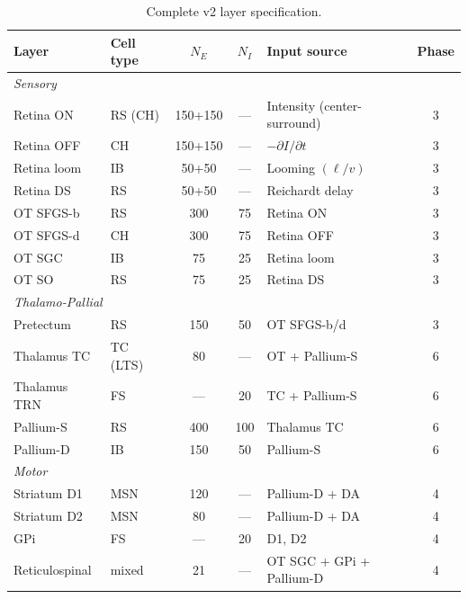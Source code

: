 \documentclass[11pt,a4paper]{article}
\begin{document}
\begin{table}[H]
\centering
\caption{Complete v2 layer specification.}
\label{tab:v2_layers}
\small
\begin{tabular}{llcclc}
\toprule
Layer & Cell type & $N_E$ & $N_I$ & Input source & Phase \\
\midrule
\multicolumn{6}{l}{\textit{Sensory}} \\
Retina ON       & RS (CH)     & 150+150 & --- & Intensity (center-surround)  & 3 \\
Retina OFF      & CH          & 150+150 & --- & $-\partial I/\partial t$      & 3 \\
Retina loom     & IB          &  50+50  & --- & Looming $(\ell/v)$            & 3 \\
Retina DS       & RS          &  50+50  & --- & Reichardt delay               & 3 \\
OT SFGS-b       & RS          & 300     & 75  & Retina ON                     & 3 \\
OT SFGS-d       & CH          & 300     & 75  & Retina OFF                    & 3 \\
OT SGC          & IB          &  75     & 25  & Retina loom                   & 3 \\
OT SO           & RS          &  75     & 25  & Retina DS                     & 3 \\
\midrule
\multicolumn{6}{l}{\textit{Thalamo-Pallial}} \\
Pretectum       & RS          & 150     & 50  & OT SFGS-b/d                  & 3 \\
Thalamus TC     & TC (LTS)    &  80     & --- & OT + Pallium-S               & 6 \\
Thalamus TRN    & FS          & ---     & 20  & TC + Pallium-S               & 6 \\
Pallium-S       & RS          & 400     & 100 & Thalamus TC                  & 6 \\
Pallium-D       & IB          & 150     & 50  & Pallium-S                    & 6 \\
\midrule
\multicolumn{6}{l}{\textit{Motor}} \\
Striatum D1     & MSN         & 120     & --- & Pallium-D + DA               & 4 \\
Striatum D2     & MSN         &  80     & --- & Pallium-D + DA               & 4 \\
GPi             & FS          & ---     & 20  & D1, D2                       & 4 \\
Reticulospinal  & mixed       &  21     & --- & OT SGC + GPi + Pallium-D     & 4 \\

\end{tabular}
\end{table}
\end{document}
